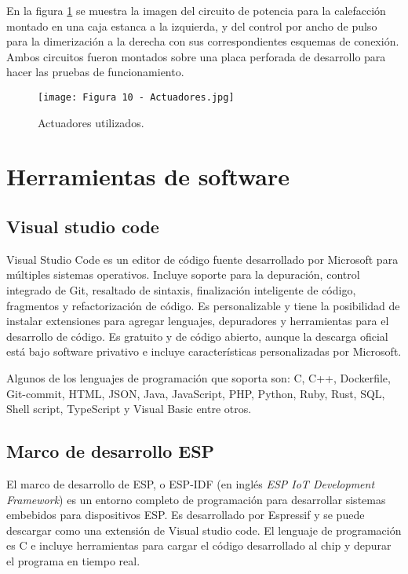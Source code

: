 En la figura \ref{fig:10} se muestra la imagen del circuito de potencia para la calefacción montado en una caja estanca a la izquierda, y del control por ancho de pulso para la dimerización a la derecha con sus correspondientes esquemas de conexión. Ambos circuitos fueron montados sobre una placa perforada de desarrollo para hacer las pruebas de funcionamiento.

\newpage
\begin{figure}[h]
\centering
\texttt{[image: Figura 10 - Actuadores.jpg]}
\caption[Actuadores]{Actuadores utilizados.}
\label{fig:10}
\end{figure}

\section{Herramientas de software}

\subsection{Visual studio code \citep{21}}

Visual Studio Code es un editor de código fuente desarrollado por Microsoft para múltiples sistemas operativos. Incluye soporte para la depuración, control integrado de Git, resaltado de sintaxis, finalización inteligente de código, fragmentos y refactorización de código. Es personalizable y tiene la posibilidad de instalar extensiones para agregar lenguajes, depuradores y herramientas para el desarrollo de código. Es gratuito y de código abierto, aunque la descarga oficial está bajo software privativo e incluye características personalizadas por Microsoft.

Algunos de los lenguajes de programación que soporta son: C, C++, Dockerfile, Git-commit, HTML, JSON, Java, JavaScript, PHP, Python, Ruby, Rust, SQL, Shell script, TypeScript y Visual Basic entre otros.

\subsection{Marco de desarrollo ESP}

El marco de desarrollo de ESP, o ESP-IDF (en inglés \textit{ESP IoT Development Framework}) es un entorno completo de programación para desarrollar sistemas embebidos para dispositivos ESP. Es desarrollado por Espressif y se puede descargar como una extensión de Visual studio code. El lenguaje de programación es C e incluye herramientas para cargar el código desarrollado al chip y depurar el programa en tiempo real.

